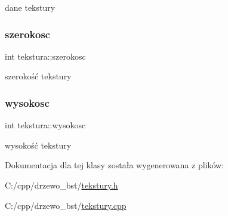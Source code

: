 dane tekstury \mbox{\label{classtekstura_ad29153487f36c0001b0a0343186504e2}} 
\subsubsection{\texorpdfstring{szerokosc}{szerokosc}}
{\footnotesize\ttfamily int tekstura\+::szerokosc}

szerokość tekstury \mbox{\label{classtekstura_a9072bd067d6d05da6b0c83bb18db8172}} 
\subsubsection{\texorpdfstring{wysokosc}{wysokosc}}
{\footnotesize\ttfamily int tekstura\+::wysokosc}

wysokość tekstury 

Dokumentacja dla tej klasy została wygenerowana z plików\+:\begin{DoxyCompactItemize}
\item 
C\+:/cpp/drzewo\+\_\+bst/\mbox{\hyperlink{tekstury_8h}{tekstury.\+h}}\item 
C\+:/cpp/drzewo\+\_\+bst/\mbox{\hyperlink{tekstury_8cpp}{tekstury.\+cpp}}\end{DoxyCompactItemize}
